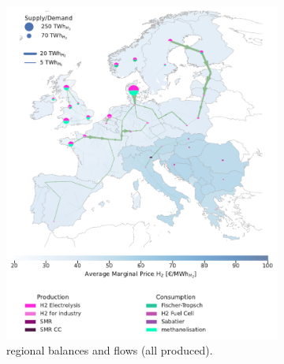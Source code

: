 \documentclass[final,5p,times,twocolumn]{elsarticle}
\begin{document}
\begin{figure}[t]
  \centering
  \begin{subfigure}[t]{0.47\textwidth} %
      \vspace{0pt}
      \includegraphics[width=\textwidth]{balance_map_h2_base} %
      \vspace{0.3cm}
      \caption{ regional balances and flows (all  produced).}
      \label{fig:balance_map_h2_base}
  \end{subfigure}
  \hfill
  \begin{subfigure}[t]{0.47\textwidth} %
      \vspace{0pt}

\end{subfigure}
\end{figure}
\end{document}
